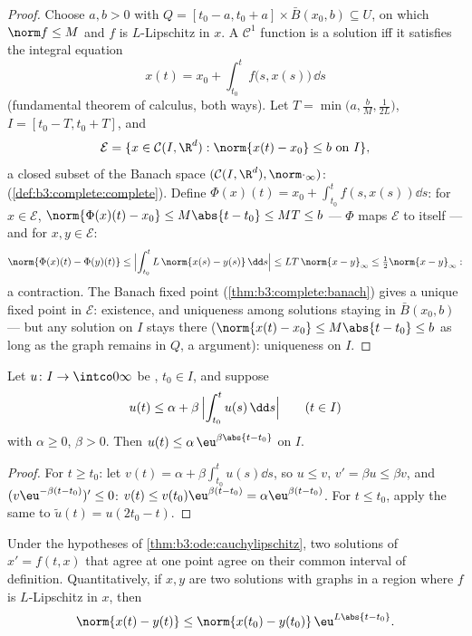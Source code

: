 \begin{proof}
Choose $a, b > 0$ with $Q = [t_0 - a, t_0 + a]\times\bar
B(x_0, b) \subseteq U$, on which $\norm f \leq M$ and $f$ is
$L$-Lipschitz in $x$. A $\mathcal C^1$ function is a solution
iff it satisfies the integral equation
\[
x(t) = x_0 + \int_{t_0}^{t}f\bigl(s, x(s)\bigr)\,\dd s
\]
(fundamental theorem of calculus, both ways). Let $T =
\min\bigl(a, \frac bM, \frac1{2L}\bigr)$, $I = [t_0 - T, t_0
+ T]$, and
\[
\mathcal E = \{x \in \mathcal C(I, \R^d) : \norm{x(t) - x_0}
\leq b\ \text{on } I\},
\]
a closed subset of the Banach space $(\mathcal C(I, \R^d),
\norm\cdot_\infty)$: 
(\cref{def:b3:complete:complete}). Define $\Phi(x)(t) = x_0 +
\int_{t_0}^tf(s, x(s))\dd s$: for $x \in \mathcal E$,
$\norm{\Phi(x)(t) - x_0} \leq M\abs{t - t_0} \leq MT \leq b$
--- $\Phi$ maps $\mathcal E$ to itself --- and for $x, y \in
\mathcal E$:
\[
\norm{\Phi(x)(t) - \Phi(y)(t)} \leq \Bigl|\int_{t_0}^t
L\,\norm{x(s) - y(s)}\,\dd s\Bigr| \leq LT\,\norm{x -
y}_\infty \leq \tfrac12\norm{x - y}_\infty :
\]
a contraction. The Banach fixed point
(\cref{thm:b3:complete:banach}) gives a unique fixed point in
$\mathcal E$: existence, and uniqueness among solutions
staying in $\bar B(x_0, b)$ --- but any solution on $I$ stays
there ($\norm{x(t) - x_0} \leq M\abs{t - t_0} \leq b$ as long
as the graph remains in $Q$, a  argument):
uniqueness on $I$.
\end{proof}

\begin{lemma}[Gr\"onwall]\label{lem:b3:ode:gronwall}
Let $u \colon I \to \intco0\infty$ be , $t_0 \in
I$, and suppose
\[
u(t) \leq \alpha + \beta\,\Bigl|\int_{t_0}^{t}u(s)\,\dd
s\Bigr| \qquad (t \in I)
\]
with $\alpha \geq 0$, $\beta > 0$. Then $u(t) \leq
\alpha\,\eu^{\beta\abs{t - t_0}}$ on $I$.
\end{lemma}

\begin{proof}
For $t \geq t_0$: let $v(t) = \alpha +
\beta\int_{t_0}^tu(s)\dd s$, so $u \leq v$, $v' = \beta u
\leq \beta v$, and $(v\eu^{-\beta(t - t_0)})' \leq 0$: $v(t)
\leq v(t_0)\eu^{\beta(t-t_0)} = \alpha\eu^{\beta(t - t_0)}$.
For $t \leq t_0$, apply the same to $\tilde u(t) = u(2t_0 -
t)$.
\end{proof}

\begin{corollary}
\label{cor:b3:ode:uniqueness}
Under the hypotheses of \cref{thm:b3:ode:cauchylipschitz},
two solutions of $x' = f(t,x)$ that agree at one point agree
on their common interval of definition. Quantitatively, if
$x, y$ are two solutions with graphs in a region where $f$ is
$L$-Lipschitz in $x$, then
\[
\norm{x(t) - y(t)} \leq \norm{x(t_0) -
y(t_0)}\,\eu^{L\abs{t - t_0}} .
\]
\end{corollary}

